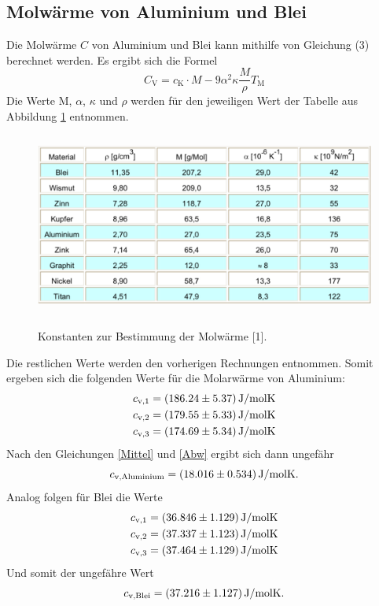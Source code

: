 \subsection{Molwärme von Aluminium und Blei}
Die Molwärme $C$ von Aluminium und Blei kann mithilfe von Gleichung (3) berechnet werden.
Es ergibt sich die Formel
\begin{equation}
	C_\text{V} = c_\text{K}\cdot M-9\alpha^2\kappa\frac{M}{\rho}T_\text{M}
\end{equation}
Die Werte M, $\alpha$, $\kappa$ und $\rho$ werden für den jeweiligen Wert der Tabelle aus Abbildung \ref{fig:Konst} entnommen.
\begin{figure}[H]
    \centering
    \caption{Konstanten zur Bestimmung der Molwärme [1].}
    \includegraphics[height=6cm]{Auswertung/Konst.pdf}
    \label{fig:Konst}
\end{figure}
Die restlichen Werte werden den vorherigen Rechnungen entnommen. 
Somit ergeben sich die folgenden Werte für die Molarwärme von Aluminium:
\begin{gather*}
	c_\text{v,1} = \SI{186,24 \pm 5,37}{\joule\per\text{mol}\kelvin}\\
	c_\text{v,2} = \SI{179,55 \pm 5,33}{\joule\per\text{mol}\kelvin}\\
	c_\text{v,3} = \SI{174,69 \pm 5,34}{\joule\per\text{mol}\kelvin}\\
\end{gather*}
Nach den Gleichungen \ref{Mittel} und \ref{Abw} ergibt sich dann ungefähr
\begin{equation*}
	c_\text{v,Aluminium} = \SI{18,016 \pm 0,534}{\joule\per\text{mol}\kelvin}.
\end{equation*}
Analog folgen für Blei die Werte
\begin{gather*}
	c_\text{v,1} = \SI{36,846 \pm 1,129}{\joule\per\text{mol}\kelvin}\\
	c_\text{v,2} = \SI{37,337 \pm 1,123}{\joule\per\text{mol}\kelvin}\\
	c_\text{v,3} = \SI{37,464 \pm 1,129}{\joule\per\text{mol}\kelvin}\\
\end{gather*}
Und somit der ungefähre Wert
\begin{equation*}
	c_\text{v,Blei} = \SI{37,216 \pm 1,127}{\joule\per\text{mol}\kelvin}.
\end{equation*}
